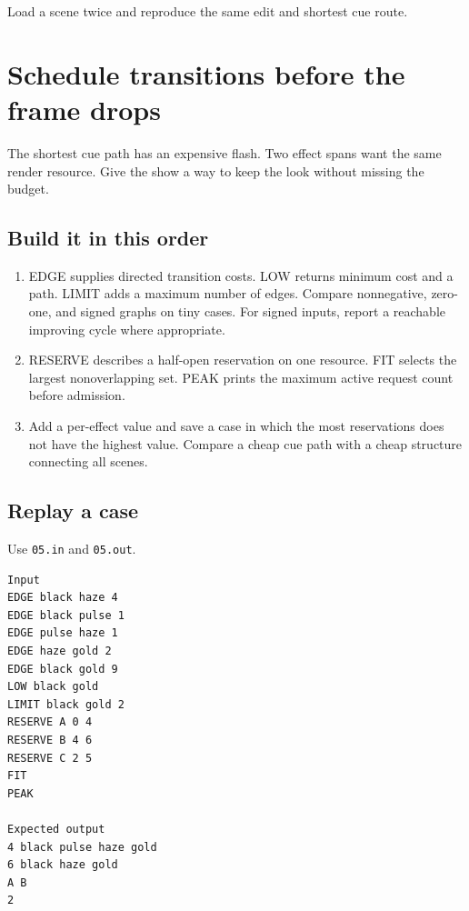 \documentclass[11pt,letterpaper]{article}
\begin{document}
Load a scene twice and reproduce the same edit and shortest cue route.

\clearpage

\section{Schedule transitions before the frame drops}\label{visuals:05}

The shortest cue path has an expensive flash. Two effect spans want the same render resource. Give the show a way to keep the look without missing the budget.

\subsection*{Build it in this order}

\begin{enumerate}
\item EDGE supplies directed transition costs. LOW returns minimum cost and a path. LIMIT adds a maximum number of edges. Compare nonnegative, zero-one, and signed graphs on tiny cases. For signed inputs, report a reachable improving cycle where appropriate.
\item RESERVE describes a half-open reservation on one resource. FIT selects the largest nonoverlapping set. PEAK prints the maximum active request count before admission.
\item Add a per-effect value and save a case in which the most reservations does not have the highest value. Compare a cheap cue path with a cheap structure connecting all scenes.
\end{enumerate}

\subsection*{Replay a case}

Use \texttt{05.in} and \texttt{05.out}.

\begin{samepage}
\small
\begin{verbatim}
Input
EDGE black haze 4
EDGE black pulse 1
EDGE pulse haze 1
EDGE haze gold 2
EDGE black gold 9
LOW black gold
LIMIT black gold 2
RESERVE A 0 4
RESERVE B 4 6
RESERVE C 2 5
FIT
PEAK

Expected output
4 black pulse haze gold
6 black haze gold
A B
2
\end{verbatim}
\end{samepage}
\end{document}

